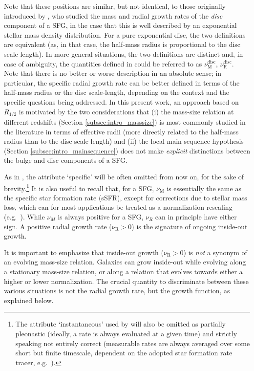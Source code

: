 \documentclass[fleqn,usenatbib]{mnras}
\begin{document}
Note that these positions are similar, but not identical, to those originally introduced by \cite{P+15}, who studied the mass and radial growth rates of the \emph{disc} component of a SFG, in the case that this is well described by an exponential stellar mass density distribution. For a pure exponential disc, the two definitions are equivalent (as, in that case, the half-mass radius is proportional to the disc scale-length). In more general situations, the two definitions are distinct and, in case of ambiguity, the quantities defined in \cite{P+15} could be referred to as $\nu_\textrm{M}^\textrm{disc}$, $\nu_\textrm{R}^\textrm{disc}$. Note that there is no better or worse description in an absolute sense; in particular, the specific radial growth rate can be better defined in terms of the half-mass radius or the disc scale-length, depending on the context and the specific questions being addressed. In this present work, an approach based on $R_{1/2}$ is motivated by the two considerations that (i) the mass-size relation at different redshifts (Section \ref{subsec:intro_masssize}) is most commonly studied in the literature in terms of effective radii (more directly related to the half-mass radius than to the disc scale-length) and (ii) the local main sequence hypothesis (Section \ref{subsec:intro_mainsequence}) does not make \emph{explicit} distinctions between the bulge and disc components of a SFG.

As in \cite{P+15}, the attribute `specific' will be often omitted from now on, for the sake of brevity.\footnote{The attribute `instantaneous' used by \cite{P+15} will also be omitted as partially pleonastic (ideally, a rate is always evaluated at a given time) and strictly speaking not entirely correct (measurable rates are always averaged over some short but finite timescale, dependent on the adopted star formation rate tracer, e.g.\ \citealt{WangLilly20}).} It is also useful to recall that, for a SFG, $\nu_\textrm{M}$ is essentially the same as the specific star formation rate (sSFR), except for corrections due to stellar mass loss, which can for most applications be treated as a normalization rescaling (e.g.\ \citealt{Lilly+13}). While $\nu_M$ is always positive for a SFG, $\nu_R$ can in principle have either sign. A positive radial growth rate ($\nu_\textrm{R} > 0$) is the signature of ongoing inside-out growth.

It is important to emphasize that inside-out growth ($\nu_\textrm{R} > 0$) is \emph{not} a synonym of an evolving mass-size relation. Galaxies can grow inside-out while evolving along a stationary mass-size relation, or along a relation that evolves towards either a higher or lower normalization. The crucial quantity to discriminate between these various situations is not the radial growth rate, but the growth function, as explained below.
\end{document}
